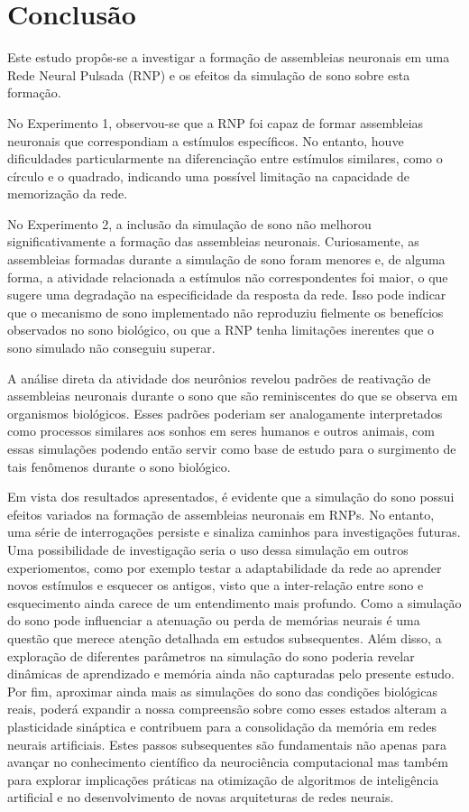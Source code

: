 \chapter{Conclusão}

Este estudo propôs-se a investigar a formação de assembleias neuronais em uma Rede Neural Pulsada (RNP) e os efeitos da simulação
de sono sobre esta formação.

No Experimento 1, observou-se que a RNP foi capaz de formar assembleias neuronais que correspondiam a estímulos específicos. No
entanto, houve dificuldades particularmente na diferenciação entre estímulos similares, como o círculo e o quadrado, indicando uma
possível limitação na capacidade de memorização da rede.

No Experimento 2, a inclusão da simulação de sono não melhorou significativamente a formação das assembleias neuronais.
Curiosamente, as assembleias formadas durante a simulação de sono foram menores e, de alguma forma, a atividade relacionada a
estímulos não correspondentes foi maior, o que sugere uma degradação na especificidade da resposta da rede. Isso pode indicar que
o mecanismo de sono implementado não reproduziu fielmente os benefícios observados no sono biológico, ou que a RNP tenha
limitações inerentes que o sono simulado não conseguiu superar.

A análise direta da atividade dos neurônios revelou padrões de reativação de assembleias neuronais durante o sono que são
reminiscentes do que se observa em organismos biológicos. Esses padrões poderiam ser analogamente interpretados como processos
similares aos sonhos em seres humanos e outros animais, com essas simulações podendo então servir como base de estudo para o
surgimento de tais fenômenos durante o sono biológico.

Em vista dos resultados apresentados, é evidente que a simulação do sono possui efeitos variados na formação de assembleias
neuronais em RNPs. No entanto, uma série de interrogações persiste e sinaliza caminhos para investigações futuras. Uma
possibilidade de investigação seria o uso dessa simulação em outros experiomentos, como por exemplo testar a adaptabilidade da
rede ao aprender novos estímulos e esquecer os antigos, visto que a inter-relação entre sono e esquecimento ainda carece de um
entendimento mais profundo. Como a simulação do sono pode influenciar a atenuação ou perda de memórias neurais é uma questão que
merece atenção detalhada em estudos subsequentes. Além disso, a exploração de diferentes parâmetros na simulação do sono poderia
revelar dinâmicas de aprendizado e memória ainda não capturadas pelo presente estudo. Por fim, aproximar ainda mais as simulações
do sono das condições biológicas reais, poderá expandir a nossa compreensão sobre como esses estados alteram a plasticidade
sináptica e contribuem para a consolidação da memória em redes neurais artificiais. Estes passos subsequentes são fundamentais não
apenas para avançar no conhecimento científico da neurociência computacional mas também para explorar implicações práticas na
otimização de algoritmos de inteligência artificial e no desenvolvimento de novas arquiteturas de redes neurais.
